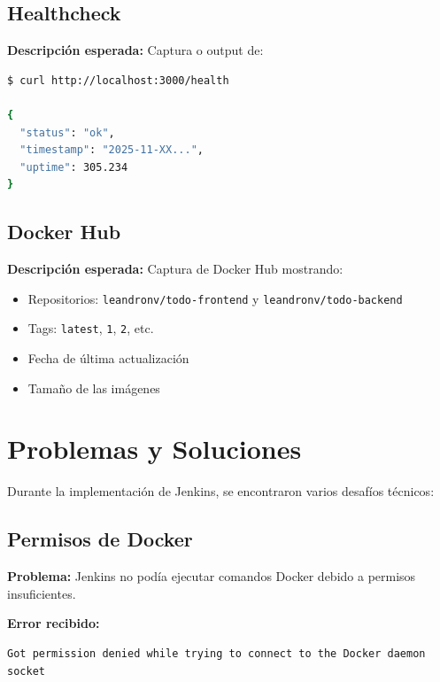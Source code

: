 \documentclass[12pt,a4paper]{article}
\begin{document}
\subsection{Healthcheck}

\textbf{Descripción esperada:} Captura o output de:
\begin{lstlisting}[language=bash]
$ curl http://localhost:3000/health

{
  "status": "ok",
  "timestamp": "2025-11-XX...",
  "uptime": 305.234
}
\end{lstlisting}

\subsection{Docker Hub}

\textbf{Descripción esperada:} Captura de Docker Hub mostrando:
\begin{itemize}
    \item Repositorios: \texttt{leandronv/todo-frontend} y \texttt{leandronv/todo-backend}
    \item Tags: \texttt{latest}, \texttt{1}, \texttt{2}, etc.
    \item Fecha de última actualización
    \item Tamaño de las imágenes
\end{itemize}

\newpage

\section{Problemas y Soluciones}

Durante la implementación de Jenkins, se encontraron varios desafíos técnicos:

\subsection{Permisos de Docker}

\textbf{Problema:} Jenkins no podía ejecutar comandos Docker debido a permisos insuficientes.

\textbf{Error recibido:}
\begin{lstlisting}
Got permission denied while trying to connect to the Docker daemon socket
\end{lstlisting}
\end{document}
